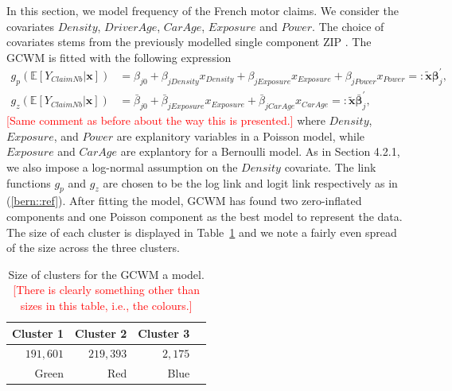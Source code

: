 \documentclass[11pt,letterpaper]{article}
\numberwithin{equation}{section}
\numberwithin{equation}{section}
\numberwithin{equation}{section}
\newcommand{\xTilda}{\tilde{\bm{x}}}
\begin{document}
In this section, we model frequency of the French motor claims. We consider the covariates $Density$, $DriverAge$, $CarAge$, $Exposure$ and $Power$. The choice of covariates stems from the previously modelled single component ZIP \citep{Charpentier:2014}.
The GCWM is fitted with the following expression
\begin{align}
g_p(\mathbb{E}\left[Y_{ClaimNb}|\bm{x}\right]) & = 
  \beta_{j0} +  \beta_{jDensity}x_{Density}+ \beta_{jExposure}  x_{Exposure}+ \beta_{jPower}x_{Power}  =: \bm{\xTilda} \bm{\beta}_j^{'},   \label{poissonReg}\\
g_z(\mathbb{E}\left[Y_{ClaimNb}|\bm{x}\right])& = \bar{\beta}_{j0} + \bar{\beta}_{jExposure} x_{Exposure} +  \bar{\beta}_{jCarAge} x_{CarAge} =: \bm{\xTilda} \bar{\bm{\beta}}_j^{'},  \label{zeroReg} 
\end{align}
\textcolor{red}{[Same comment as before about the way this is presented.]}
where $Density$, $Exposure$, and $Power$ are explanitory variables in a Poisson model, while $Exposure$ and $Car Age$ are explantory for a Bernoulli model. As in Section 4.2.1, we also impose a log-normal assumption on the $Density$ covariate. The link functions $g_p$ and $g_z$ are chosen to be the log link and logit link respectively as in (\ref{bern::ref}).
After fitting the model, GCWM has found two zero-inflated components and one Poisson component as the best model to represent the data. The size of each cluster is displayed in Table~\ref{table:sizeFreq} and we note a fairly even spread of the size across the three clusters.
\begin{table}[!htb]
\centering
\caption{Size of clusters for the GCWM a model. \textcolor{red}{[There is clearly something other than sizes in this table, i.e., the colours.]}}
\label{table:sizeFreq}
\begin{tabular}{rrrr}
\hline
Cluster 1   & Cluster 2  & Cluster 3   \\
\hline
$191,601$& $219,393$ & $2,175$ \\
Green & Red & Blue  \\
\hline
\end{tabular}
\end{table}
\end{document}
